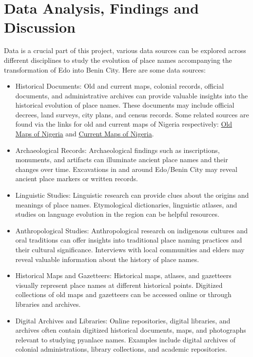\chapter{Data Analysis, Findings and Discussion }

Data is a crucial part of this project, various data sources can be explored across different disciplines to study the evolution of place names accompanying the transformation of Edo into Benin City. Here are some data sources:

\begin{itemize}
    \item Historical Documents: Old and current maps, colonial records, official documents, and administrative archives can provide valuable insights into the historical evolution of place names. These documents may include official decrees, land surveys, city plans, and census records. Some related sources are found via the links for old and current maps of Nigeria respectively: \href{https://www.oldmapsonline.org/en/Nigeria}{Old Maps of Nigeria} and \href{https://nigeria.africageoportal.com/pages/Tools}{Current Maps of Nigeria}.
    \item Archaeological Records: Archaeological findings such as inscriptions, monuments, and artifacts can illuminate ancient place names and their changes over time. Excavations in and around Edo/Benin City may reveal ancient place markers or written records.
    \item Linguistic Studies: Linguistic research can provide clues about the origins and meanings of place names. Etymological dictionaries, linguistic atlases, and studies on language evolution in the region can be helpful resources.
    \item Anthropological Studies: Anthropological research on indigenous cultures and oral traditions can offer insights into traditional place naming practices and their cultural significance. Interviews with local communities and elders may reveal valuable information about the history of place names.
    \item Historical Maps and Gazetteers: Historical maps, atlases, and gazetteers visually represent place names at different historical points. Digitized collections of old maps and gazetteers can be accessed online or through libraries and archives.
    \item Digital Archives and Libraries: Online repositories, digital libraries, and archives often contain digitized historical documents, maps, and photographs relevant to studying pyanlace names. Examples include digital archives of colonial administrations, library collections, and academic repositories.

\end{itemize}
